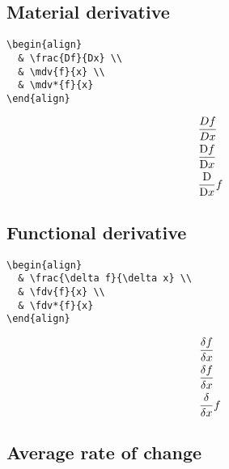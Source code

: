 \documentclass[../../latex]{subfiles}
\begin{document}
\subsection{Material derivative}

\begin{minipage}{0.47 \textwidth}
  \begin{verbatim}
\begin{align}
  & \frac{Df}{Dx} \\
  & \mdv{f}{x} \\
  & \mdv*{f}{x}
\end{align}
  \end{verbatim}
\end{minipage}
\hfill
\begin{minipage}{0.47 \textwidth}
  \begin{align}
     & \frac{Df}{Dx} \\
     & \mdv{f}{x}    \\
     & \mdv*{f}{x}
  \end{align}
\end{minipage}

\subsection{Functional derivative}

\begin{minipage}{0.47 \textwidth}
  \begin{verbatim}
\begin{align}
  & \frac{\delta f}{\delta x} \\
  & \fdv{f}{x} \\
  & \fdv*{f}{x}
\end{align}
  \end{verbatim}
\end{minipage}
\hfill
\begin{minipage}{0.47 \textwidth}
  \begin{align}
     & \frac{\delta f}{\delta x} \\
     & \fdv{f}{x}                \\
     & \fdv*{f}{x}
  \end{align}
\end{minipage}

\subsection{Average rate of change}
\end{document}
